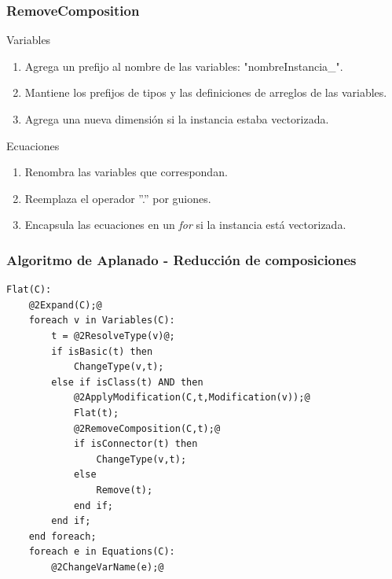 \begin{frame}[fragile,t]
\frametitle{RemoveComposition} 
\begin{block}{Variables}
\begin{enumerate}
\item Agrega un prefijo al nombre de las variables: "nombreInstancia\_".
\item Mantiene los prefijos de tipos y las definiciones de arreglos de las variables. 
\item Agrega una nueva dimensión si la instancia estaba vectorizada.   
\end{enumerate}
\end{block}
\pause
\begin{block}{Ecuaciones}
\begin{enumerate}
\item Renombra las variables que correspondan.
\item Reemplaza el operador ''.'' por guiones.
\item Encapsula las ecuaciones en un \textit{for} si la instancia está vectorizada.
\end{enumerate}
\end{block}
\end{frame}

\begin{frame}[fragile]
\frametitle{Algoritmo de Aplanado - Reducción de composiciones} 
\begin{lstlisting}[style=base,basicstyle=\scriptsize]
Flat(C):
    @2Expand(C);@
    foreach v in Variables(C):
        t = @2ResolveType(v)@;
        if isBasic(t) then 
            ChangeType(v,t);
        else if isClass(t) AND then
            @2ApplyModification(C,t,Modification(v));@
            Flat(t);
            @2RemoveComposition(C,t);@  
            if isConnector(t) then
                ChangeType(v,t);
            else
                Remove(t);
            end if;     
        end if;     
    end foreach;    
    foreach e in Equations(C):  
        @2ChangeVarName(e);@     
\end{lstlisting}
\end{frame}


